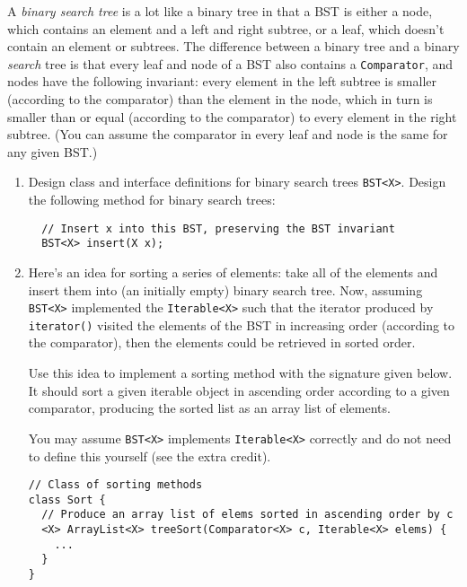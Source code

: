 \documentclass[12pt]{article}                   %
\def\pts#1{\marginpar{\footnotesize \raggedright  \fbox{#1 {\sc Points}}}}
\begin{document}
\vfill\thispagestyle{empty}
\newpage

\begin{problem} \pts{20}

A \emph{binary search tree} is a lot like a binary tree in that a BST
is either a node, which contains an element and a left and right
subtree, or a leaf, which doesn't contain an element or subtrees.  The
difference between a binary tree and a binary \emph{search} tree is
that every leaf and node of a BST also contains a \texttt{Comparator},
and nodes have the following invariant: every element in the left
subtree is smaller (according to the comparator) than the element in
the node, which in turn is smaller than or equal (according to the
comparator) to every element in the right subtree.  (You can assume
the comparator in every leaf and node is the same for any given BST.)

\begin{enumerate}
\item Design class and interface definitions for binary search trees
  \texttt{BST<X>}.  Design the following method for binary search
  trees:
  \begin{verbatim}
  // Insert x into this BST, preserving the BST invariant
  BST<X> insert(X x);
\end{verbatim}

\ifrubric\else
{}
\fi

\newpage
\item Here's an idea for sorting a series of elements: take all of the
 elements and insert them into (an initially empty) binary search
 tree.  Now, assuming \texttt{BST<X>} implemented the
 \texttt{Iterable<X>} such that the iterator produced by
 \texttt{iterator()} visited the elements of the BST in increasing
 order (according to the comparator), then the elements could be retrieved
in sorted order.

Use this idea to implement a sorting method with the signature given
 below.  It should sort a given iterable object in ascending order
 according to a given comparator, producing the sorted list as an
 array list of elements.

You may assume \texttt{BST<X>} implements \texttt{Iterable<X>} correctly
and do not need to define this yourself (see the extra credit).

{\small
\begin{verbatim}
// Class of sorting methods
class Sort {
  // Produce an array list of elems sorted in ascending order by c
  <X> ArrayList<X> treeSort(Comparator<X> c, Iterable<X> elems) { 
    ... 
  }
}
\end{verbatim}}
\end{enumerate}

\ifrubric
\else
{}
\fi
\newpage
\newpage
\end{problem}
\end{document}
